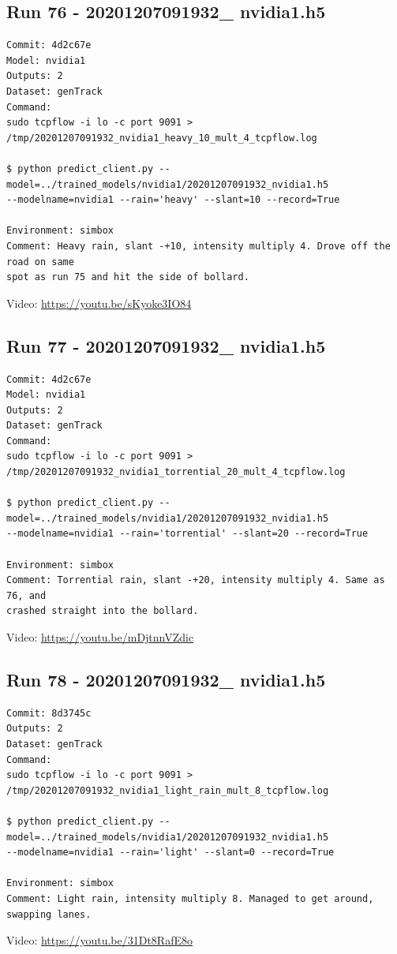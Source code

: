 \subsection{Run 76 - 20201207091932\_ nvidia1.h5 }
\label{app_res:76}
\begin{verbatim}
Commit: 4d2c67e
Model: nvidia1
Outputs: 2
Dataset: genTrack
Command:
sudo tcpflow -i lo -c port 9091 > /tmp/20201207091932_nvidia1_heavy_10_mult_4_tcpflow.log

$ python predict_client.py --model=../trained_models/nvidia1/20201207091932_nvidia1.h5
--modelname=nvidia1 --rain='heavy' --slant=10 --record=True

Environment: simbox
Comment: Heavy rain, slant -+10, intensity multiply 4. Drove off the road on same
spot as run 75 and hit the side of bollard.
\end{verbatim}
Video: \url{https://youtu.be/sKyoke3IO84}

\subsection{Run 77 - 20201207091932\_ nvidia1.h5 }
\label{app_res:77}
\begin{verbatim}
Commit: 4d2c67e
Model: nvidia1
Outputs: 2
Dataset: genTrack
Command:
sudo tcpflow -i lo -c port 9091 >
/tmp/20201207091932_nvidia1_torrential_20_mult_4_tcpflow.log

$ python predict_client.py --model=../trained_models/nvidia1/20201207091932_nvidia1.h5
--modelname=nvidia1 --rain='torrential' --slant=20 --record=True

Environment: simbox
Comment: Torrential rain, slant -+20, intensity multiply 4. Same as 76, and
crashed straight into the bollard.
\end{verbatim}
Video: \url{https://youtu.be/mDjtnnVZdic}

\subsection{Run 78 - 20201207091932\_ nvidia1.h5 }
\label{app_res:78}
\begin{verbatim}
Commit: 8d3745c 
Outputs: 2
Dataset: genTrack
Command:
sudo tcpflow -i lo -c port 9091 >
/tmp/20201207091932_nvidia1_light_rain_mult_8_tcpflow.log

$ python predict_client.py --model=../trained_models/nvidia1/20201207091932_nvidia1.h5
--modelname=nvidia1 --rain='light' --slant=0 --record=True

Environment: simbox
Comment: Light rain, intensity multiply 8. Managed to get around, swapping lanes.
\end{verbatim}
Video: \url{https://youtu.be/31Dt8RafE8o}

